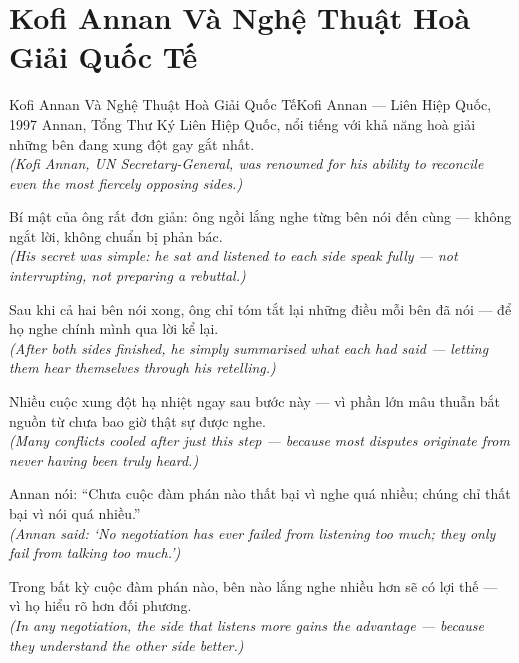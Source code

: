 \section{Kofi Annan Và Nghệ Thuật Hoà Giải Quốc Tế}
\begin{truyen}{Kofi Annan Và Nghệ Thuật Hoà Giải Quốc Tế}{Kofi Annan --- Liên Hiệp Quốc, 1997}
 Annan, Tổng Thư Ký Liên Hiệp Quốc, nổi tiếng với khả năng hoà giải những bên đang xung đột gay gắt nhất.\\[4pt]
\textit{(Kofi Annan, UN Secretary-General, was renowned for his ability to reconcile even the most fiercely opposing sides.)}

Bí mật của ông rất đơn giản: ông ngồi lắng nghe từng bên nói đến cùng --- không ngắt lời, không chuẩn bị phản bác.\\[4pt]
\textit{(His secret was simple: he sat and listened to each side speak fully --- not interrupting, not preparing a rebuttal.)}

Sau khi cả hai bên nói xong, ông chỉ tóm tắt lại những điều mỗi bên đã nói --- để họ nghe chính mình qua lời kể lại.\\[4pt]
\textit{(After both sides finished, he simply summarised what each had said --- letting them hear themselves through his retelling.)}

Nhiều cuộc xung đột hạ nhiệt ngay sau bước này --- vì phần lớn mâu thuẫn bắt nguồn từ chưa bao giờ thật sự được nghe.\\[4pt]
\textit{(Many conflicts cooled after just this step --- because most disputes originate from never having been truly heard.)}

Annan nói: ``Chưa cuộc đàm phán nào thất bại vì nghe quá nhiều; chúng chỉ thất bại vì nói quá nhiều.''\\[4pt]
\textit{(Annan said: `No negotiation has ever failed from listening too much; they only fail from talking too much.')}

\end{truyen}
\begin{baihoc}
  Trong bất kỳ cuộc đàm phán nào, bên nào lắng nghe nhiều hơn sẽ có lợi thế --- vì họ hiểu rõ hơn đối phương.\\[4pt]
  \textit{(In any negotiation, the side that listens more gains the advantage --- because they understand the other side better.)}
\end{baihoc}

